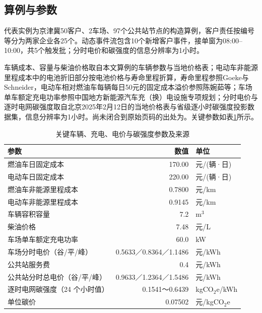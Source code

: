 \subsection{算例与参数}

代表实例为京津冀50客户、2车场、97个公共站节点的构造算例，客户责任按编号等分为两家企业各25个。动态事件流包含10个新增客户事件，接单窗为08:00--10:00，共5个触发批；分时电价和碳强度的信息分辨率为1小时。

车辆成本、容量与柴油价格取自本文算例的车辆参数与当地价格表；电动车非能源里程成本中的电池折旧部分按电池价格与寿命里程折算，寿命里程参照Goeke与Schneider\cite{ref:goeke-2015}，电动车相对燃油车每辆每日50元的固定成本溢价参照陈婉茹等\cite{ref:chen-wanru-2023}；车场单车额定充电功率参照中国地方新能源汽车充（换）电设施专项规划；分时电价与逐时电网碳强度取自北京2025年2月12日的当地价格表与省级逐小时碳强度投影数据集，信息分辨率为1小时。尚未闭合到原始页码的出处为。关键参数如表\ref{tab:parameters}所示。

\begin{table}[htbp]
  \centering
  \caption{关键车辆、充电、电价与碳强度参数及来源}
  \label{tab:parameters}
  \scriptsize
  \begin{tabular}{lrl}
    \toprule
    参数 & 数值 & 单位\\
    \midrule
    燃油车日固定成本 & 170.00 & 元/(辆·日)\\
    电动车日固定成本 & 220.00 & 元/(辆·日)\\
    燃油车非能源里程成本 & 0.7800 & 元/km\\
    电动车非能源里程成本 & 0.9145 & 元/km\\
    车辆容积容量 & 7.2 & m$^3$\\
    柴油价格 & 7.48 & 元/L\\
    车场单车额定充电功率 & 60.0 & kW\\
    车场分时电价（谷/平/峰） & 0.5633／0.8364／1.1486 & 元/kWh\\
    公共站服务费 & 0.4 & 元/kWh\\
    公共站分时总电价（谷/平/峰） & 0.9633／1.2364／1.5486 & 元/kWh\\
    逐时电网碳强度（24 个小时值） & 0.1541～0.6439 & kgCO$_2$e/kWh\\
    单位碳价 & 0.07502 & 元/kgCO$_2$e\\
    \bottomrule
  \end{tabular}
\end{table}
